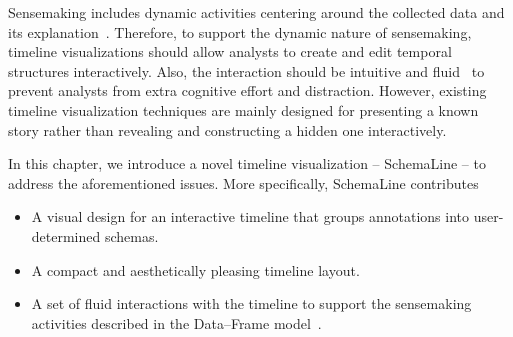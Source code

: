 Sensemaking includes dynamic activities centering around the collected data and its explanation~\cite{Klein2003}. Therefore, to support the dynamic nature of sensemaking, timeline visualizations should allow analysts to create and edit temporal structures interactively. Also, the interaction should be intuitive and fluid~\cite{Elmqvist2011} to prevent analysts from extra cognitive effort and distraction. However, existing timeline visualization techniques are mainly designed for presenting a known story rather than revealing and constructing a hidden one interactively.

In this chapter, we introduce a novel timeline visualization -- SchemaLine -- to address the aforementioned issues. More specifically, SchemaLine contributes
\begin{itemize}
	\item A visual design for an interactive timeline that groups annotations into user-determined schemas.
	\item A compact and aesthetically pleasing timeline layout.
	\item A set of fluid interactions with the timeline to support the sensemaking activities described in the Data--Frame model~\cite{Klein2003}.
\end{itemize}